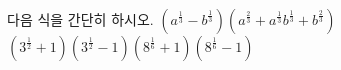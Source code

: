 다음 식을 간단히 하시오. 
 $(a^{\frac{1}{3}}-b^{\frac{1}{3}})(a^{\frac{2}{3}}+a^{\frac{1}{3}}b^{\frac{1}{3}}+b^{\frac{2}{3}})$
 $(3^{\frac{1}{2}}+1)(3^{\frac{1}{2}}-1)(8^{\frac{1}{6}}+1)(8^{\frac{1}{6}}-1)$
